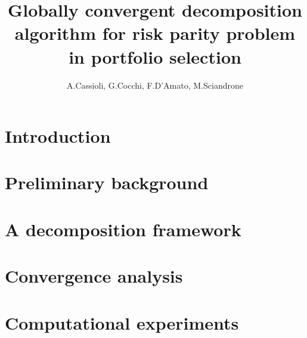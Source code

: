 \documentclass{article}[11pt]
\title{Globally convergent decomposition algorithm for risk parity problem in portfolio selection}
\author{A.Cassioli, G.Cocchi, F.D'Amato, M.Sciandrone}
\begin{document}
\maketitle 
\section{Introduction}


\section{Preliminary background}\label{sect:2}


\section{A decomposition framework}


\section{Convergence analysis}


\section{Computational experiments}

\end{document}
